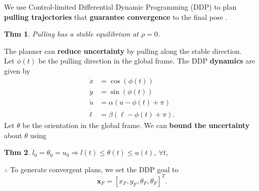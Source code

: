 \documentclass[landscape,paperwidth=42in,paperheight=32in,margin=1.5in,fontscale = 0.32]{baposter} %
\newtheorem{theorem}{Thm}
\begin{document}
\begin{poster}
{  We use Control-limited Differential Dynamic Programming (DDP) to
  plan \textbf{pulling trajectories} that \textbf{guarantee
    convergence} to the final pose \cite{tassa2014control}. 

  \begin{theorem} Pulling has a stable equilibrium at $\rho = 0$. \label{item:1}
  \end{theorem}

  The planner can \textbf{reduce uncertainty} by pulling along the stable direction.\\

  Let $\phi(t)$ be the pulling direction in the global frame. The
  DDP \textbf{dynamics} are given by
  \begin{align}
    \dot{x} &= \cos(\phi(t))\\
    \dot{y} &= \sin(\phi(t))\\
    \dot{u} &=  \alpha(u - \phi(t) + \pi) \label{eq:u-ode}\\ 
    \dot{\ell} &=  \beta(\ell - \phi(t) + \pi).
  \end{align}
  Let $\theta$ be the orientation in the global frame. We can
  \textbf{bound the uncertainty} about $\theta$ using
  \begin{theorem} $l_0 = \theta_0 = u_0 \Rightarrow l(t) \leq \theta(t) \leq u(t)$, $\forall t$,
  \end{theorem}
  $\therefore$ To generate convergent plans, we set the DDP goal to
  \begin{equation}
    \mathbf{x}_F = [x_F, y_F, \theta_F, \theta_F]^T.
  \end{equation}
}


\end{poster}
\end{document}
